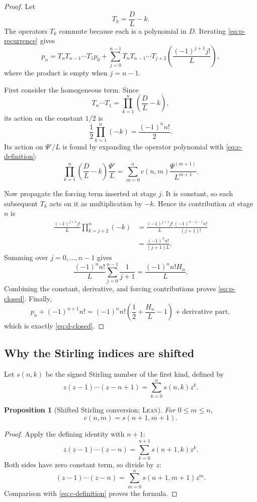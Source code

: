 \documentclass[11pt,oneside]{article}
\newtheorem{proposition}[theorem]{Proposition}
\theoremstyle{definition}
\theoremstyle{remark}
\newcommand{\Formalized}{\textsc{Lean}}
\begin{document}
\begin{proof}
Let
\[
 T_k=\frac DL-k.
\]
The operators $T_k$ commute because each is a polynomial in $D$.  Iterating
\eqref{eq:p-recurrence} gives
\begin{equation}
 p_n=T_nT_{n-1}\cdots T_1p_0
 +\sum_{j=0}^{n-1}
   T_nT_{n-1}\cdots T_{j+2}
   \left(\frac{(-1)^{j+1}j!}{L}\right),
 \label{eq:p-iteration}
\end{equation}
where the product is empty when $j=n-1$.

First consider the homogeneous term.  Since
\[
 T_n\cdots T_1
 =\prod_{k=1}^n\left(\frac DL-k\right),
\]
its action on the constant $1/2$ is
\[
 \frac12\prod_{k=1}^n(-k)=\frac{(-1)^nn!}{2}.
\]
Its action on $\Psi'/L$ is found by expanding the operator polynomial with
\eqref{eq:c-definition}:
\[
 \prod_{k=1}^n\left(\frac DL-k\right)\frac{\Psi'}L
 =\sum_{m=0}^n
   c(n,m)\frac{\Psi^{(m+1)}}{L^{m+1}}.
\]

Now propagate the forcing term inserted at stage $j$.  It is constant, so
each subsequent $T_k$ acts on it as multiplication by $-k$.  Hence its
contribution at stage $n$ is
\begin{align*}
 \frac{(-1)^{j+1}j!}{L}
 \prod_{k=j+2}^n(-k)
 &=
 \frac{(-1)^{j+1}j!}{L}
 \frac{(-1)^{n-j-1}n!}{(j+1)!}\\
 &=\frac{(-1)^nn!}{(j+1)L}.
\end{align*}
Summing over $j=0,\dots,n-1$ gives
\[
 \frac{(-1)^nn!}{L}\sum_{j=0}^{n-1}\frac1{j+1}
 =\frac{(-1)^nn!H_n}{L}.
\]
Combining the constant, derivative, and forcing contributions proves
\eqref{eq:p-closed}.  Finally,
\[
 p_n+(-1)^{n+1}n!
 =(-1)^nn!\left(\frac12+\frac{H_n}{L}-1\right)
   +\text{derivative part},
\]
which is exactly \eqref{eq:d-closed}.
\end{proof}

\subsection{Why the Stirling indices are shifted}

Let $s(n,k)$ be the signed Stirling number of the first kind, defined by
\[
 z(z-1)\cdots(z-n+1)=\sum_{k=0}^n s(n,k)z^k.
\]

\begin{proposition}[Shifted Stirling conversion; \Formalized]
\label{prop:stirling-shift}
For $0\leq m\leq n$,
\[
 c(n,m)=s(n+1,m+1).
\]
\end{proposition}

\begin{proof}
Apply the defining identity with $n+1$:
\[
 z(z-1)\cdots(z-n)
 =\sum_{k=0}^{n+1}s(n+1,k)z^k.
\]
Both sides have zero constant term, so divide by $z$:
\[
 (z-1)\cdots(z-n)
 =\sum_{m=0}^n s(n+1,m+1)z^m.
\]
Comparison with \eqref{eq:c-definition} proves the formula.
\end{proof}
\end{document}
